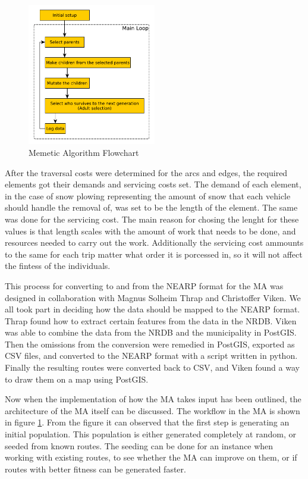 \begin{figure}
	\begin{center}
		\includegraphics[width=0.5\textwidth]{figures/Architecture/MA_flowchart.pdf}
	\end{center}
	\caption{Memetic Algorithm Flowchart}
	\label{fig:ma_flowchart}
\end{figure}

After the traversal costs were determined for the arcs and edges, the required elements got their demands and servicing costs set. The demand of each element, in the case of snow plowing representing the amount of snow that each vehicle should handle the removal of, was set to be the length of the element. The same was done for the servicing cost. The main reason for chosing the lenght for these values is that length scales with the amount of work that needs to be done, and resources needed to carry out the work. Additionally the servicing cost ammounts to the same for each trip matter what order it is porcessed in, so it will not affect the fintess of the individuals.

This process for converting to and from the NEARP format for the MA was designed in collaboration with Magnus Solheim Thrap and Christoffer Viken. We all took part in deciding how the data should be mapped to the NEARP format. Thrap found how to extract certain features from the data in the NRDB. Viken was able to combine the data from the NRDB and the municipality in PostGIS. Then the omissions from the conversion were remedied in PostGIS, exported as CSV files, and converted to the NEARP format with a script written in python. Finally the resulting routes were converted back to CSV, and Viken found a way to draw them on a map using PostGIS.

Now when the implementation of how the MA takes input has been outlined, the architecture of the MA itself can be discussed. The workflow in the MA is shown in figure \ref{fig:ma_flowchart}. From the figure it can observed that the first step is generating an initial population. This population is either generated completely at random, or seeded from known routes. The seeding can be done for an instance when working with existing routes, to see whether the MA can improve on them, or if routes with better fitness can be generated faster.

